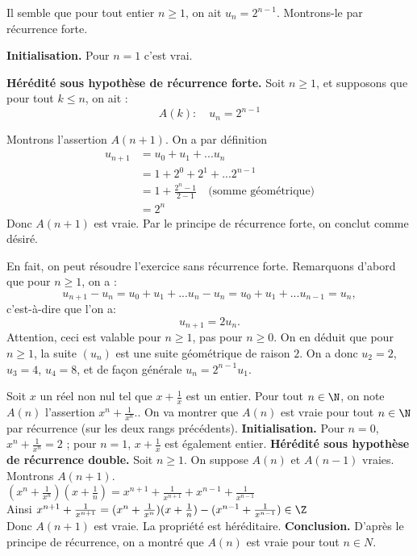 \begin{Soln}{51}

Il semble que pour tout entier $n\geq 1$, on ait $u_n = 2^{n-1}$. Montrons-le par récurrence forte.

\noindent \textbf{Initialisation.} Pour $n=1$ c'est vrai.

\noindent\textbf{Hérédité sous hypothèse de récurrence forte.} Soit $n\geq 1$, et supposons que pour tout $k\leq n$, on ait :
\[ A(k): \quad u_n = 2^{n-1} \]

Montrons l'assertion $A(n+1)$. On a par définition
\begin{align*}
u_{n+1}
&= u_0+u_1+ ... u_n\\
&= 1 + 2^0 + 2^1+ ...2^{n-1}\\
&= 1+ \frac{2^n-1}{2-1} \quad \text{(somme géométrique)}\\
&= 2^n
\end{align*}
Donc $A(n+1)$ est vraie. Par le principe de récurrence forte, on conclut comme désiré.\\

\begin{remarque}
En fait, on peut résoudre l'exercice sans récurrence forte. Remarquons d'abord que pour $n\geq 1$, on a :
\[u_{n+1}-u_n = u_0+u_1+ ... u_n - u_n = u_0+u_1+ ... u_{n-1} = u_n,\]
c'est-à-dire que l'on a:
\[ u_{n+1} = 2u_n.\]
Attention, ceci est valable pour $n\geq 1$, pas pour $n\geq 0$. On en déduit que pour $n\geq 1$, la suite  $(u_n)$ est une suite géométrique de raison $2$. On a donc $u_2 = 2$, $u_3 = 4$, $u_4=8$, et de façon générale $u_n = 2^{n-1}u_1$.
\end{remarque}
\end{Soln}
\begin{Soln}{52}
Soit $x$ un réel non nul tel que $x + \frac{1}{x}$ est un entier. Pour tout $n \in \N$, on note $A(n)$ l'assertion \og $x^n + \frac{1}{x^n}$.\fg. On va montrer que $A(n)$ est vraie pour tout $n \in \N$ par récurrence (sur les deux rangs précédents).
\textbf{Initialisation.} Pour $n = 0$, $x^n + \frac{1}{x^n} = 2$ ; pour $n = 1$, $x + \frac{1}{x}$ est également entier.
\textbf{Hérédité sous hypothèse de récurrence double.} Soit $n \geq 1$. On suppose $A(n)$ et $A(n-1)$ vraies. Montrons $A(n+1)$. \\
$(x^n + \frac{1}{x^n})(x+\frac{1}{n}) = x^{n+1} + \frac{1}{x^{n+1}} + x^{n-1} + \frac{1}{x^{n-1}}$\\
Ainsi $x^{n+1} + \frac{1}{x^{n+1}} = (x^n + \frac{1}{x^n})(x+\frac{1}{n}) - (x^{n-1} + \frac{1}{x^{n-1}}) \in \Z$\\
Donc $A(n+1)$ est vraie. La propriété est héréditaire.
\textbf{Conclusion.} D'après le principe de récurrence, on a montré que $A(n)$ est vraie pour tout $n \in N$.\\
\end{Soln}
